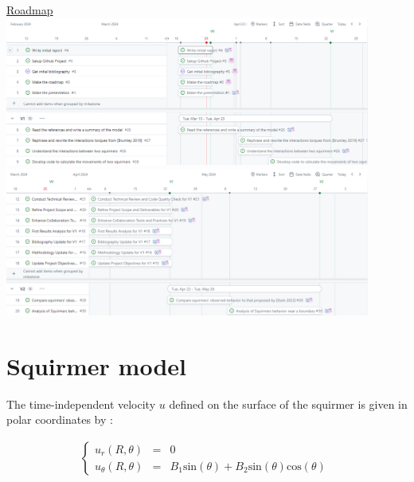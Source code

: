 \documentclass{article}
\begin{document}
\begin{center}
    \href{https://github.com/orgs/master-csmi/projects/23/views/2}{Roadmap}
    \includegraphics[width=0.9\textwidth]{Presentation/V0/images/roadmapV0_1.png}
    \vspace{1em} %
    \includegraphics[width=0.9\textwidth]{Presentation/V0/images/roadmapV0_2.png}
\end{center}

\newpage
\section{Squirmer model}
The time-independent velocity $u$ defined on the surface of the squirmer is given 
in polar coordinates by :

\begin{align*}
   \left\{\begin{array}{rcl}
      u_r(R,\theta) &=& 0 \\
      u_\theta(R,\theta) &=& B_1\mathrm{sin}(\theta)+B_2\mathrm{sin}(\theta)\mathrm{cos}(\theta)
   \end{array}\right.\;
\end{align*}
\end{document}
